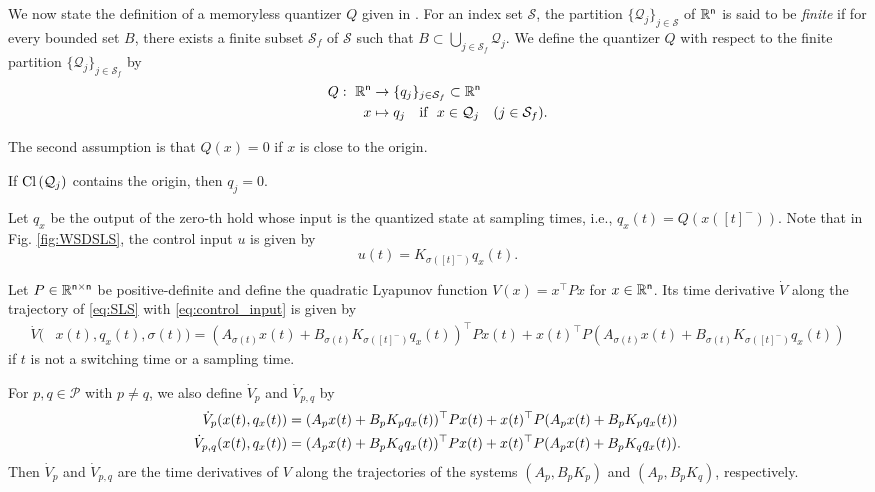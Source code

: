 \documentclass[a4, 11pt]{article}
\newcommand{\Cl}{\mathop{\rm Cl~\!}}
\begin{document}
We now state the definition of a memoryless quantizer $Q$ given in \cite{Ishii2004}.
For an index set $\mathcal{S}$,
the partition $\{\mathcal{Q}_j\}_{j \in \mathcal{S}}$ 
of $\mathbb{R}^{\sf n}$ is 
said to be \textit{finite} if for every bounded set $B$, there exists a
finite subset $\mathcal{S}_f$ of $\mathcal{S}$ such that
$B \subset \bigcup_{j \in \mathcal{S}_f} \mathcal{Q}_j$.
We define
the quantizer $Q$ 
with respect to the finite partition $\{\mathcal{Q}_j\}_{j \in \mathcal{S}_f}$
by
\begin{align*}
Q:~\mathbb{R}^{\sf n} &\to 
\{q_j \}_{j \in \mathcal{S}_f} \subset \mathbb{R}^{\sf n} \\
x &\mapsto q_j \quad \text{if~~} x \in \mathcal{Q}_j\quad (j \in \mathcal{S}_f).
\end{align*}

The second assumption is that $Q(x) = 0$ if $x$ is close to the origin. 
\begin{assumption}
\label{ass:quantization_near_origin}
If $\Cl (\mathcal{Q}_j)$ contains the origin, then $q_j = 0$.
\end{assumption}

Let $q_x$ be the output of the zero-th hold whose input is 
the quantized state at sampling times, i.e.,
$
q_x(t) = Q(x([t]^-)).
$
Note that in Fig. \ref{fig:WSDSLS}, the control input $u$ is given by
\begin{equation}
\label{eq:control_input}
u(t) = K_{\sigma([t]^-)}q_x(t).
\end{equation}

Let $P \in \mathbb{R}^{\sf n \times n}$ be positive-definite and 
define the quadratic Lyapunov function
$V(x) = x^{\top} P x$ for $x \in \mathbb{R}^{\sf n}$.
Its time derivative $\dot V$ along the trajectory of \eqref{eq:SLS} with \eqref{eq:control_input}
is given by
\begin{align}
\dot V(&x(t),q_x(t),\sigma(t))
= (A_{\sigma(t)}x(t)+B_{\sigma(t)}K_{\sigma([t]^-)}q_x(t))^{\top}Px(t)
\label{eq:dotV_def}
+x(t)^{\top}P(A_{\sigma(t)}x(t)+B_{\sigma(t)}K_{\sigma([t]^-)}q_x(t))
\end{align}
if $t$ is not a switching time or a sampling time.

For $p,q \in \mathcal{P}$ with $p \not= q$, 
we also define $\dot V_p$ and $\dot V_{p,q}$ by
\begin{align}
\dot V_p(x(t),q_x(t))
&=
(A_px(t)+B_pK_pq_x(t))^{\top}Px(t) 
+x(t)^{\top}P(A_px(t)+B_pK_pq_x(t)) \notag \\
\dot V_{p,q}(x(t),q_x(t)) 
&=
(A_px(t)+B_pK_qq_x(t))^{\top}Px(t) 
+x(t)^{\top}P(A_px(t)+B_pK_qq_x(t)). 
\label{eq:Vpq_def}
\end{align}
Then
$\dot V_{p}$ and $\dot V_{p,q}$ are the time derivatives of $V$
along the trajectories of the systems $(A_p, B_pK_p)$ and $(A_p, B_pK_q)$, 
respectively.
\end{document}
